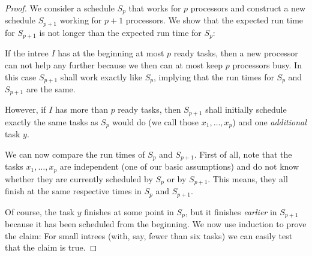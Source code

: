 \begin{proof}
  We consider a schedule $S_p$ that works for $p$ processors and construct a new schedule $S_{p+1}$ working for $p+1$ processors. We show that the expected run time for $S_{p+1}$ is not longer than the expected run time for $S_p$:

  If the intree $I$ has at the beginning at most $p$ ready tasks, then a new processor can not help any further because we then can at most keep $p$ processors busy. In this case $S_{p+1}$ shall work exactly like $S_p$, implying that the run times for $S_p$ and $S_{p+1}$ are the same.

  However, if $I$ has more than $p$ ready tasks, then $S_{p+1}$ shall initially schedule exactly the same tasks as $S_p$ would do (we call those $x_1,\dots,x_p$) and one \emph{additional} task $y$.

  We can now compare the run times of $S_p$ and $S_{p+1}$. First of all, note that the tasks $x_1,\dots,x_p$ are independent (one of our basic assumptions) and do not know whether they are currently scheduled by $S_p$ or by $S_{p+1}$. This means, they all finish at the same respective times in $S_p$ and $S_{p+1}$. 

  Of course, the task $y$ finishes at some point in $S_p$, but it finishes \emph{earlier} in $S_{p+1}$ because it has been scheduled from the beginning. We now use induction to prove the claim: For small intrees (with, say, fewer than six tasks) we can easily test that the claim is true.



\end{proof}
